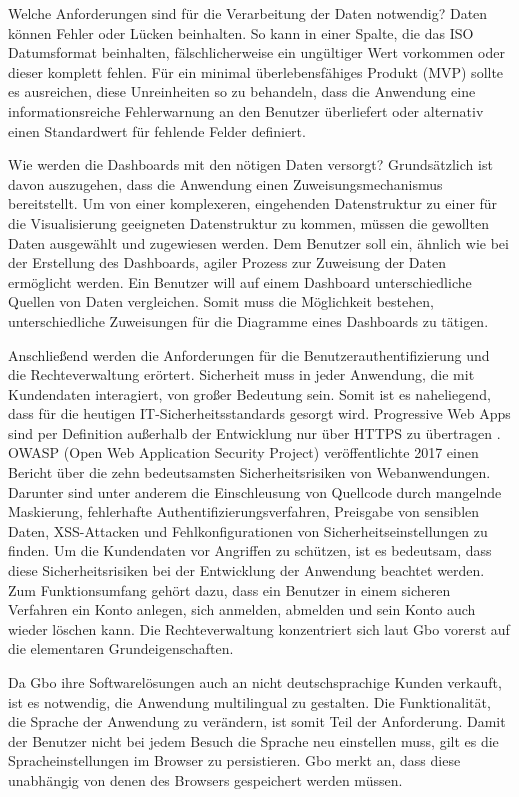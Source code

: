 Welche Anforderungen sind für die Verarbeitung der Daten notwendig? Daten können Fehler oder Lücken
beinhalten. So kann in einer Spalte, die das ISO Datumsformat beinhalten, fälschlicherweise ein
ungültiger Wert vorkommen oder dieser komplett fehlen. Für ein minimal überlebensfähiges
Produkt (MVP) sollte es ausreichen, diese Unreinheiten so zu behandeln, dass die Anwendung
eine informationsreiche Fehlerwarnung an den Benutzer überliefert oder alternativ einen Standardwert
für fehlende Felder definiert.

Wie werden die Dashboards mit den nötigen Daten versorgt? Grundsätzlich ist davon auszugehen,
dass die Anwendung einen Zuweisungsmechanismus bereitstellt. Um von einer komplexeren, eingehenden
Datenstruktur zu einer für die Visualisierung geeigneten Datenstruktur zu kommen, müssen die gewollten
Daten ausgewählt und zugewiesen werden. Dem Benutzer soll ein, ähnlich wie bei der Erstellung
des Dashboards, agiler Prozess zur Zuweisung der Daten ermöglicht werden. Ein Benutzer will auf einem
Dashboard unterschiedliche Quellen von Daten vergleichen. Somit muss die Möglichkeit bestehen,
unterschiedliche Zuweisungen für die Diagramme eines Dashboards zu tätigen.

Anschließend werden die Anforderungen für die Benutzerauthentifizierung und die Rechteverwaltung erörtert.
Sicherheit muss in jeder Anwendung, die mit Kundendaten interagiert, von großer Bedeutung sein.
Somit ist es naheliegend, dass für die heutigen IT-Sicherheitsstandards gesorgt wird. Progressive
Web Apps sind per Definition außerhalb der Entwicklung nur über HTTPS zu übertragen \cite[S. 16]{KevinFrankPWAMasterarbeit}.
OWASP (Open Web Application Security Project) veröffentlichte 2017 einen Bericht über die zehn
bedeutsamsten Sicherheitsrisiken von Webanwendungen. Darunter sind unter anderem die Einschleusung
von Quellcode durch mangelnde Maskierung, fehlerhafte Authentifizierungsverfahren, Preisgabe von sensiblen Daten,
XSS-Attacken und Fehlkonfigurationen von Sicherheitseinstellungen zu finden.\cite[S. 4]{OWASPTopTen}
Um die Kundendaten vor Angriffen zu schützen, ist es bedeutsam, dass diese Sicherheitsrisiken bei der
Entwicklung der Anwendung beachtet werden. Zum Funktionsumfang gehört dazu,
dass ein Benutzer in einem sicheren Verfahren ein Konto anlegen,
sich anmelden, abmelden und sein Konto auch wieder
löschen kann. Die Rechteverwaltung konzentriert sich laut Gbo vorerst auf die elementaren
Grundeigenschaften.

Da Gbo ihre Softwarelösungen auch an nicht deutschsprachige Kunden verkauft, ist es notwendig,
die Anwendung multilingual zu gestalten. Die Funktionalität, die Sprache der Anwendung zu verändern,
ist somit Teil der Anforderung. Damit der Benutzer nicht bei jedem Besuch die Sprache neu einstellen
muss, gilt es die Spracheinstellungen im Browser zu persistieren. Gbo merkt an, dass diese
unabhängig von denen des Browsers gespeichert werden müssen.

